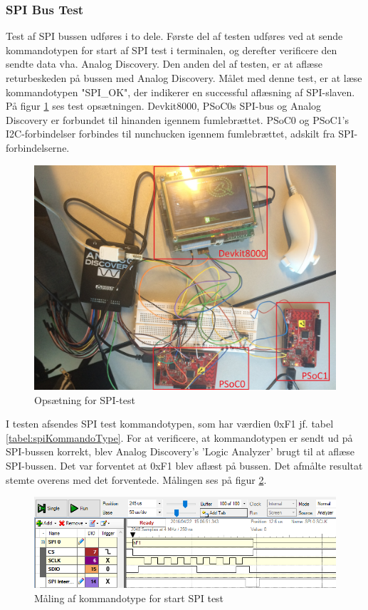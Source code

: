 \subsubsection{SPI Bus Test}
Test af SPI bussen udføres i to dele. Første del af testen udføres ved at sende kommandotypen for start af SPI test i terminalen, og derefter verificere den sendte data vha. Analog Discovery. Den anden del af testen, er at aflæse returbeskeden på bussen med Analog Discovery. Målet med denne test, er at læse kommandotypen "SPI\_OK", der indikerer en successful aflæsning af SPI-slaven.  På figur \ref{figure:SpiTestSetup} ses test opsætningen. Devkit8000, PSoC0s SPI-bus og Analog Discovery  er forbundet til hinanden igennem fumlebrættet. PSoC0 og PSoC1's I2C-forbindelser forbindes til nunchucken igennem fumlebrættet, adskilt fra SPI-forbindelserne.


\begin{figure}[H]
	\centering
	\includegraphics[width=\textwidth]{Test/images/SPItest/SpiTestSetup}
	\caption{Opsætning for SPI-test}
	\label{figure:SpiTestSetup}
\end{figure}


I testen afsendes SPI test kommandotypen, som har værdien 0xF1 jf. tabel \ref{tabel:spiKommandoType}. For at verificere, at kommandotypen er sendt ud på SPI-bussen korrekt, blev Analog Discovery's 'Logic Analyzer' brugt til at aflæse SPI-bussen. Det var forventet at 0xF1 blev aflæst på bussen. Det afmålte resultat stemte overens med det forventede. Målingen ses på figur \ref{fig:SPItestkommandotype}. 

\begin{figure}[H]
	\centering
	\includegraphics[width=\textwidth]{Test/images/SPItest/SPItestkommandotype}
	\caption{Måling af kommandotype for start SPI test}
	\label{fig:SPItestkommandotype}
\end{figure}

